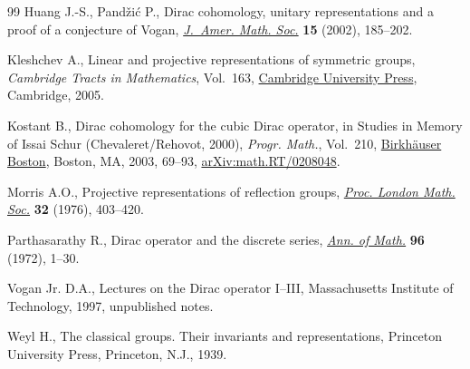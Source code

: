 \documentclass[pdftex]{sigma}
\numberwithin{equation}{section}
\begin{document}
\begin{thebibliography}{99}
Huang J.-S., Pand\v{z}i\'c P., Dirac cohomology, unitary representations and a
 proof of a conjecture of {V}ogan, \href{https://doi.org/10.1090/S0894-0347-01-00383-6}{\textit{J.~Amer. Math. Soc.}} \textbf{15}
 (2002), 185--202.

Kleshchev A., Linear and projective representations of symmetric groups,
 \textit{Cambridge Tracts in Mathematics}, Vol.~163, \href{https://doi.org/10.1017/CBO9780511542800}{Cambridge University
 Press}, Cambridge, 2005.

Kostant B., Dirac cohomology for the cubic {D}irac operator, in Studies in
 Memory of {I}ssai {S}chur ({C}hevaleret/{R}ehovot, 2000), \textit{Progr.
 Math.}, Vol.~210, \href{https://doi.org/10.1007/978-1-4612-0045-1_4}{Birkh\"auser Boston}, Boston, MA, 2003, 69--93,
 \href{https://arxiv.org/abs/math.RT/0208048}{arXiv:math.RT/0208048}.

Morris A.O., Projective representations of reflection groups, \href{https://doi.org/10.1112/plms/s3-32.3.403}{\textit{Proc.
 London Math. Soc.}} \textbf{32} (1976), 403--420.

Parthasarathy R., Dirac operator and the discrete series, \href{https://doi.org/10.2307/1970892}{\textit{Ann. of
 Math.}} \textbf{96} (1972), 1--30.

Vogan Jr. D.A., Lectures on the {D}irac operator {I}--{III}, {M}assachusetts
 Institute of Technology, 1997, unpublished notes.

Weyl H., The classical groups. {T}heir invariants and representations,
 Princeton University Press, Princeton, N.J., 1939.

\end{thebibliography}\LastPageEnding
\end{document}
